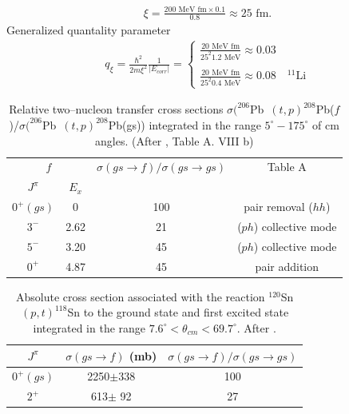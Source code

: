 \begin{subappendices}
 \begin{align}
 \xi=\frac{200\text{ MeV fm}\times 0.1}{0.8}\approx 25\text{ fm}.
 \end{align} 
 Generalized quantality parameter 
 \begin{align}
 q_{\xi}=\frac{\hbar^2}{2m\xi^2}\frac{1}{|E_{corr}|}=\left\{\begin{array}{l}
 \frac{20\text{ MeV fm}}{25^2 1.2\text{ MeV}}\approx 0.03	\\ 
 \\ 
 \frac{20\text{ MeV fm}}{25^2 0.4\text{ MeV}}\approx 0.08\quad ^{11}\text{Li}	
 \end{array}\right. 
 \end{align}
    \begin{table}
    	\begin{tabular}{|c|c|c|c|}
    		\hline
    		\multicolumn{2}{|c|}{$f$} & $\sigma(gs\rightarrow f)/\sigma(gs\rightarrow gs)$ & Table A   \\
    		\cline{1-2}
    		$J^{\pi}$& $E_x$ & & \\
    		\hline
    		$0^+(gs)$ & 0& 100& pair removal ($hh$)\\
    		\hline
    		$3^-$ & 2.62& 21& ($ph$) collective mode\\
    		\hline
    		$5^-$ & 3.20& 45& ($ph$) collective mode\\
    		\hline
    		$0^+$ & 4.87& 45& pair addition\\
    		\hline
    	\end{tabular}\caption{Relative two--nucleon transfer cross sections \mbox{$\sigma (^{206}$Pb $(t,p)^{208}$Pb($f$)/$\sigma (^{206}$Pb $(t,p)^{208}$Pb(gs))} integrated in the range $5^\circ-175^\circ$ of cm angles. (After \cite{Broglia:73}, Table A. VIII b)}\label{Tab3.B.1}
    \end{table}
    \begin{table}
    	\begin{tabular}{|c|c|c|}
    		\hline
    		$J^{\pi}$& $\sigma(gs\rightarrow f)$ (mb) & $\sigma(gs\rightarrow f)/\sigma(gs\rightarrow gs)$  \\
    		\hline
    		$0^+(gs)$ & 2250$\pm$338& 100\\
    		$2^+$ & 613$\pm$ 92& 27\\
    		\hline
    	\end{tabular}\caption{Absolute cross section associated with the reaction $^{120}$Sn $(p,t)^{118}$Sn to the ground state and first excited state integrated in the range $7.6^\circ < \theta_{cm}<69.7^\circ$. After \cite{Guazzoni:08}.}\label{Tab3.B.2}
    \end{table}
    

\end{subappendices}
